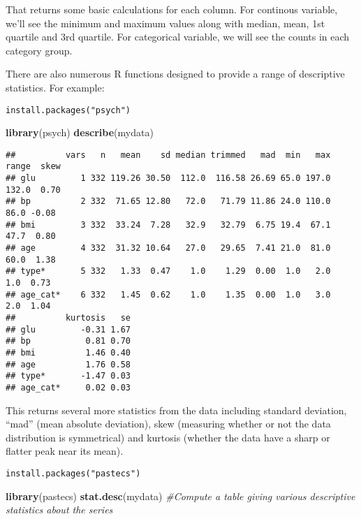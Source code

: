 \documentclass[]{book}
\newenvironment{Shaded}{\begin{snugshade}}{\end{snugshade}}
\newcommand{\KeywordTok}[1]{\textcolor[rgb]{0.13,0.29,0.53}{\textbf{#1}}}
\newcommand{\CommentTok}[1]{\textcolor[rgb]{0.56,0.35,0.01}{\textit{#1}}}
\newcommand{\NormalTok}[1]{#1}
\theoremstyle{definition}
\theoremstyle{definition}
\theoremstyle{definition}
\theoremstyle{remark}
\begin{document}
That returns some basic calculations for each column. For continous
variable, we'll see the minimum and maximum values along with median,
mean, 1st quartile and 3rd quartile. For categorical variable, we will
see the counts in each category group.

There are also numerous R functions designed to provide a range of
descriptive statistics. For example:

\begin{verbatim}
install.packages("psych")
\end{verbatim}

\begin{Shaded}
\begin{Highlighting}[]
\KeywordTok{library}\NormalTok{(psych)}
\KeywordTok{describe}\NormalTok{(mydata)}
\end{Highlighting}
\end{Shaded}

\begin{verbatim}
##          vars   n   mean    sd median trimmed   mad  min   max range  skew
## glu         1 332 119.26 30.50  112.0  116.58 26.69 65.0 197.0 132.0  0.70
## bp          2 332  71.65 12.80   72.0   71.79 11.86 24.0 110.0  86.0 -0.08
## bmi         3 332  33.24  7.28   32.9   32.79  6.75 19.4  67.1  47.7  0.80
## age         4 332  31.32 10.64   27.0   29.65  7.41 21.0  81.0  60.0  1.38
## type*       5 332   1.33  0.47    1.0    1.29  0.00  1.0   2.0   1.0  0.73
## age_cat*    6 332   1.45  0.62    1.0    1.35  0.00  1.0   3.0   2.0  1.04
##          kurtosis   se
## glu         -0.31 1.67
## bp           0.81 0.70
## bmi          1.46 0.40
## age          1.76 0.58
## type*       -1.47 0.03
## age_cat*     0.02 0.03
\end{verbatim}

This returns several more statistics from the data including standard
deviation, ``mad'' (mean absolute deviation), skew (measuring whether or
not the data distribution is symmetrical) and kurtosis (whether the data
have a sharp or flatter peak near its mean).

\begin{verbatim}
install.packages("pastecs")
\end{verbatim}

\begin{Shaded}
\begin{Highlighting}[]
\KeywordTok{library}\NormalTok{(pastecs)}
\KeywordTok{stat.desc}\NormalTok{(mydata) }\CommentTok{#Compute a table giving various descriptive statistics about the series }
\end{Highlighting}
\end{Shaded}
\end{document}
